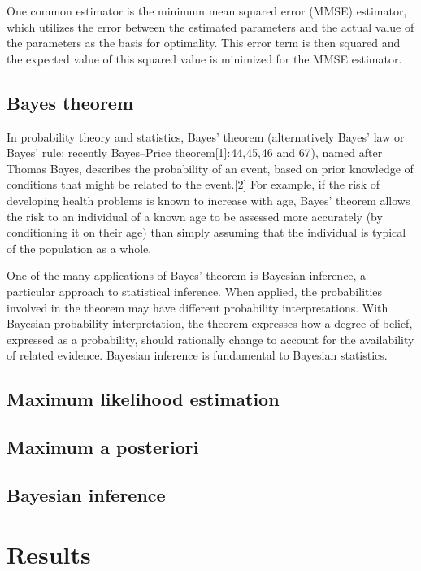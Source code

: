 \documentclass[a4paper,fleqn]{cas-dc}
\begin{document}
One common estimator is the minimum mean squared error (MMSE) estimator, which utilizes the error between the estimated parameters and the actual value of the parameters as the basis for optimality. This error term is then squared and the expected value of this squared value is minimized for the MMSE estimator.

\subsection{Bayes theorem} \label{CH: Bayes_theorem}
In probability theory and statistics, Bayes' theorem (alternatively Bayes' law or Bayes' rule; recently Bayes–Price theorem[1]: 44, 45, 46 and 67 ), named after Thomas Bayes, describes the probability of an event, based on prior knowledge of conditions that might be related to the event.[2] For example, if the risk of developing health problems is known to increase with age, Bayes' theorem allows the risk to an individual of a known age to be assessed more accurately (by conditioning it on their age) than simply assuming that the individual is typical of the population as a whole.

One of the many applications of Bayes' theorem is Bayesian inference, a particular approach to statistical inference. When applied, the probabilities involved in the theorem may have different probability interpretations. With Bayesian probability interpretation, the theorem expresses how a degree of belief, expressed as a probability, should rationally change to account for the availability of related evidence. Bayesian inference is fundamental to Bayesian statistics.

\subsection{Maximum likelihood estimation} \label{CH: MLE}
\subsection{Maximum a posteriori} \label{CH: MAP}
\subsection{Bayesian inference} \label{CH: Bayesian_inference}

\section{Results} \label{CH: Results}
\end{document}
